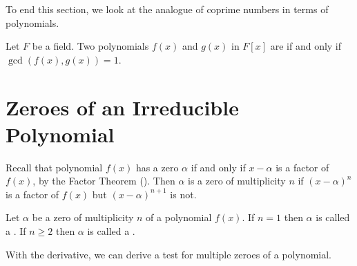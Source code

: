 To end this section, we look at the analogue of coprime numbers in terms of polynomials.

\begin{definition}
    Let $F$ be a field. Two polynomials $f(x)$ and $g(x)$ in $F[x]$ are  if and only if $\gcd(f(x), g(x)) = 1$.
\end{definition}

\section{Zeroes of an Irreducible Polynomial}
Recall that polynomial $f(x)$ has a zero $\alpha$ if and only if $x-\alpha$ is a factor of $f(x)$, by the Factor Theorem (). Then $\alpha$ is a zero of multiplicity $n$ if $(x-\alpha)^n$ is a factor of $f(x)$ but $(x-\alpha)^{n+1}$ is not.

\begin{definition}
    Let $\alpha$ be a zero of multiplicity $n$ of a polynomial $f(x)$. If $n = 1$ then $\alpha$ is called a . If $n \geq 2$ then $\alpha$ is called a .
\end{definition}

With the derivative, we can derive a test for multiple zeroes of a polynomial.

